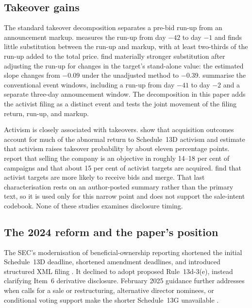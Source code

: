 \subsection{Takeover gains}
\label{sec:lit-measurement}

The standard takeover decomposition separates a pre-bid run-up from an
announcement markup. \textcite{schwert1996} measures the run-up from day $-42$
to day $-1$ and finds little substitution between the run-up and markup, with at
least two-thirds of the run-up added to the total price. \textcite{bett2014}
find materially stronger substitution after adjusting the run-up for changes in
the target's stand-alone value: the estimated slope changes from $-0.09$ under
the unadjusted method to $-0.39$. \textcite{eckbomalenkothorburn2025} summarise
the conventional event windows, including a run-up from day $-41$ to day $-2$
and a separate three-day announcement window. The decomposition in this paper
adds the activist filing as a distinct event and tests the joint movement of the
filing return, run-up, and markup.

Activism is closely associated with takeovers. \textcite{greenwoodschor2009}
show that acquisition outcomes account for much of the abnormal return to
Schedule~13D activism and estimate that activism raises takeover probability by
about eleven percentage points. \textcite{brav2008} report that selling the
company is an objective in roughly 14--18 per cent of campaigns and that about
15 per cent of activist targets are acquired. \textcite{boysongantchevshivdasani2017}
find that activist targets are more likely to receive bids and merge. That last
characterisation rests on an author-posted summary rather than the primary text,
so it is used only for this narrow point and does not support the sale-intent
codebook. None of these studies examines disclosure timing.

\subsection{The 2024 reform and the paper's position}
\label{sec:lit-reform}

The SEC's modernisation of beneficial-ownership reporting shortened the initial
Schedule~13D deadline, shortened amendment deadlines, and introduced structured
XML filing \parencite{sec2023modernization}. It declined to adopt proposed
Rule~13d-3(e), instead clarifying Item~6 derivative disclosure. February 2025
guidance further addresses when calls for a sale or restructuring, alternative
director nominees, or conditional voting support make the shorter Schedule~13G
unavailable \parencite{seccdi2025}.

